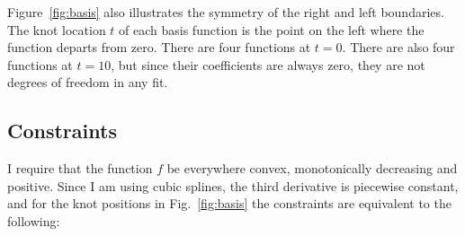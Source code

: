 \documentclass[11pt]{article}
\begin{document}
Figure~\ref{fig:basis} also illustrates the symmetry of the right and
left boundaries.  The knot location $t$ of each basis function is the
point on the left where the function departs from zero.  There are
four functions at $t=0$.  There are also four functions at $t=10$, but
since their coefficients are always zero, they are not degrees of
freedom in any fit.

\subsection{Constraints}
\label{sec:constraints}

I require that the function $f$ be everywhere convex, monotonically
decreasing and positive.  Since I am using cubic splines, the third
derivative is piecewise constant, and for the knot positions in
Fig.~\ref{fig:basis} the constraints are equivalent to the following:
\end{document}
